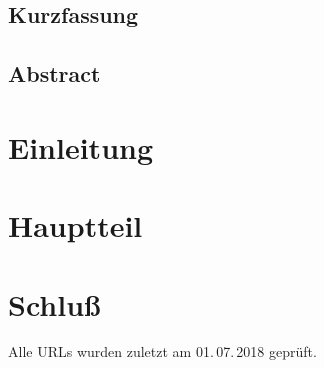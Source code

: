 \documentclass[%
  a4paper,%
  twoside,%
  listof = totoc,%
  bibliography = totoc,%
  headsepline,%
  cleardoublepage = empty,%
  parskip = half%
]{scrbook}
\begin{document}
\Titelblatt

\pagestyle{preamble}
\renewcommand*{\chapterpagestyle}{preamble}
\section*{Kurzfassung}
\lipsum

\section*{Abstract}
\lipsum

\foreignlanguage{english}{}

\cleardoublepage

\tableofcontents
\listoffigures
\listoftables

\chapter{Einleitung}
\lipsum\autocite{turing1936}
\chapter{Hauptteil}
\lipsum
\chapter{Schluß}
\lipsum

\clearpage

\printbibliography

Alle URLs wurden zuletzt am 01.\,07.\,2018 geprüft.

\pagestyle{empty}
\renewcommand*{\chapterpagestyle}{empty}
\Versicherung
\end{document}
